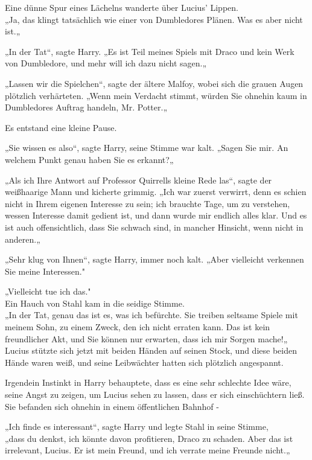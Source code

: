 {Eine dünne Spur eines Lächelns wanderte über Lucius' Lippen.\\ „Ja, das klingt tatsächlich wie einer von Dumbledores Plänen. Was es aber nicht ist.„

„In der Tat“, sagte Harry. „Es ist Teil meines Spiels mit Draco und kein Werk von Dumbledore, und mehr will ich dazu nicht sagen.„

„Lassen wir die Spielchen“, sagte der ältere Malfoy, wobei sich die grauen Augen plötzlich verhärteten. „Wenn mein Verdacht stimmt, würden Sie ohnehin kaum in Dumbledores Auftrag handeln, Mr. Potter.„

Es entstand eine kleine Pause.

„Sie wissen es also“, sagte Harry, seine Stimme war kalt. „Sagen Sie mir. An welchem Punkt genau haben Sie es erkannt?„

„Als ich Ihre Antwort auf Professor Quirrells kleine Rede las“, sagte der weißhaarige Mann und kicherte grimmig. „Ich war zuerst verwirrt, denn es schien nicht in Ihrem eigenen Interesse zu sein; ich brauchte Tage, um zu verstehen, wessen Interesse damit gedient ist, und dann wurde mir endlich alles klar. Und es ist auch offensichtlich, dass Sie schwach sind, in mancher Hinsicht, wenn nicht in anderen.„

„Sehr klug von Ihnen“, sagte Harry, immer noch kalt. „Aber vielleicht verkennen Sie meine Interessen."

„Vielleicht tue ich das."\\ Ein Hauch von Stahl kam in die seidige Stimme.\\ „In der Tat, genau das ist es, was ich befürchte. Sie treiben seltsame Spiele mit meinem Sohn, zu einem Zweck, den ich nicht erraten kann. Das ist kein freundlicher Akt, und Sie können nur erwarten, dass ich mir Sorgen mache!„\\ Lucius stützte sich jetzt mit beiden Händen auf seinen Stock, und diese beiden Hände waren weiß, und seine Leibwächter hatten sich plötzlich angespannt.

Irgendein Instinkt in Harry behauptete, dass es eine sehr schlechte Idee wäre, seine Angst zu zeigen, um Lucius sehen zu lassen, dass er sich einschüchtern ließ. Sie befanden sich ohnehin in einem öffentlichen Bahnhof -

„Ich finde es interessant“, sagte Harry und legte Stahl in seine Stimme,\\ „dass du denkst, ich könnte davon profitieren, Draco zu schaden. Aber das ist irrelevant, Lucius. Er ist mein Freund, und ich verrate meine Freunde nicht.„

}
